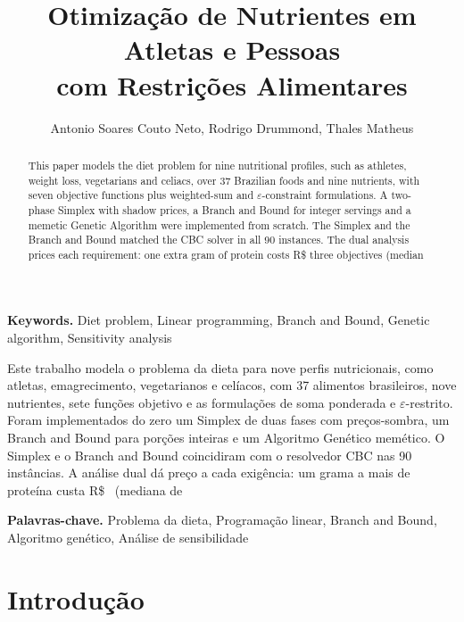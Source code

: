 \documentclass[12pt]{article}
\title{Otimização de Nutrientes em Atletas e Pessoas\\com Restrições Alimentares}
\author{Antonio Soares Couto Neto\inst{1}, Rodrigo Drummond\inst{1}, Thales Matheus\inst{1}}
\begin{document}
\maketitle

\begin{abstract}
This paper models the diet problem for nine nutritional profiles, such as athletes,
weight loss, vegetarians and celiacs, over 37 Brazilian foods and nine nutrients, with
seven objective functions plus weighted-sum and $\varepsilon$-constraint formulations.
A two-phase Simplex with shadow prices, a Branch and Bound for integer servings and a
memetic Genetic Algorithm were implemented from scratch. The Simplex and the Branch and
Bound matched the CBC solver in all 90 instances. The dual analysis prices each
requirement: one extra gram of protein costs R\$ %
three objectives (median %
\end{abstract}

\noindent\textbf{Keywords.} Diet problem, Linear programming, Branch and Bound, Genetic
algorithm, Sensitivity analysis

\begin{resumo}
Este trabalho modela o problema da dieta para nove perfis nutricionais, como atletas,
emagrecimento, vegetarianos e celíacos, com 37 alimentos brasileiros, nove nutrientes,
sete funções objetivo e as formulações de soma ponderada e $\varepsilon$-restrito.
Foram implementados do zero um Simplex de duas fases com preços-sombra, um Branch and
Bound para porções inteiras e um Algoritmo Genético memético. O Simplex e o Branch and
Bound coincidiram com o resolvedor CBC nas 90 instâncias. A análise dual dá preço a cada
exigência: um grama a mais de proteína custa R\$~%
(mediana de %
\end{resumo}

\noindent\textbf{Palavras-chave.} Problema da dieta, Programação linear, Branch and
Bound, Algoritmo genético, Análise de sensibilidade

\section{Introdução}
\end{document}
